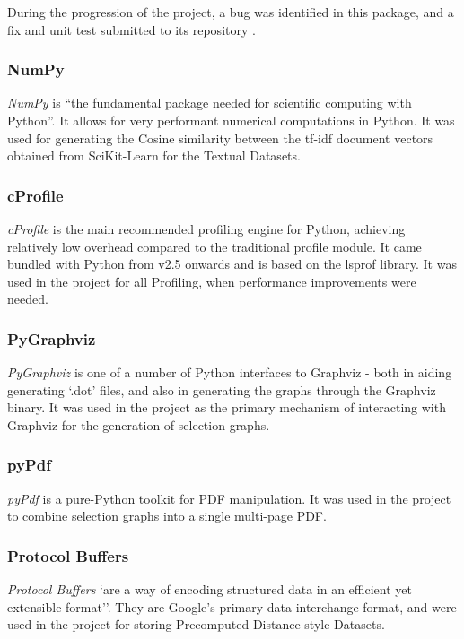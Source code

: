 \documentclass[a4paper,11pt]{report}
\begin{document}
During the progression of the project, a bug was identified in this package, and a fix and unit test submitted to its repository \citep{web:scikitpullreq}.

\subsubsection*{NumPy}
\emph{NumPy} \citep{prog:numpy} is ``the fundamental package needed for scientific computing with Python''. It allows for very performant numerical computations in Python. It was used for generating the Cosine similarity between the tf-idf document vectors obtained from SciKit-Learn for the Textual Datasets.
 
\subsubsection*{cProfile}
\emph{cProfile} \citep{prog:cprofile} is the main recommended profiling engine for Python, achieving relatively low overhead compared to the traditional profile module. It came bundled with Python from v2.5 onwards and is based on the lsprof \citep{prog:lsprof} library. It was used in the project for all Profiling, when performance improvements were needed.

\subsubsection*{PyGraphviz}
\emph{PyGraphviz} \citep{prog:pygraphviz} is one of a number of Python interfaces to Graphviz - both in aiding generating `.dot' files, and also in generating the graphs through the Graphviz binary. It was used in the project as the primary mechanism of interacting with Graphviz for the generation of selection graphs. 

\subsubsection*{pyPdf}
\emph{pyPdf} \citep{prog:pypdf} is a pure-Python toolkit for PDF manipulation. It was used in the project to combine selection graphs into a single multi-page PDF.

\subsubsection*{Protocol Buffers}
\emph{Protocol Buffers} \citep{prog:protocolbuffers} `are a way of encoding structured data in an efficient yet extensible format''. They are Google's primary data-interchange format, and were used in the project for storing Precomputed Distance style Datasets.
\end{document}
